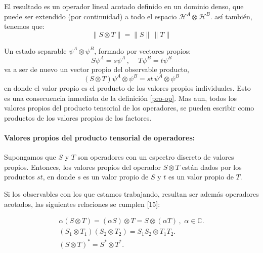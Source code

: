 \documentclass[12pt]{book}
\numberwithin{equation}{chapter}
\def\C{\mathbb{C}}
\def\H{\mathcal{H}}
\def\pr{\otimes}
\begin{document}
El resultado es un operador lineal acotado definido en un dominio denso, que puede ser extendido (por continuidad) a todo el espacio $\H^{A} \pr \H^{B}$. as\'i tambi\'en, tenemos que:
\begin{equation}
\| S \pr T \|= \| S \| \, \| T \|
\end{equation}

Un estado separable $\psi^{A} \pr \psi^{B}$, formado por vectores propios:
\begin{equation}
S\psi^{A}= s \psi^{A} \,,\,\,\,\,\,\,\, T \psi^{B}= t \psi^{B}
\end{equation}
va a ser de nuevo un vector propio del observable producto,
\begin{equation}
(S \pr T)\psi^{A} \pr \psi^{B}= st \, \psi^{A} \pr \psi^{B}
\end{equation}
en donde el valor propio es el producto de los valores propios individuales. Esto es una consecuencia inmediata de la definici\'on \eqref{pro-op}. Mas aun, todos los valores propios del producto tensorial de los operadores, se pueden escribir como productos de los valores propios de los factores. 

\paragraph{Valores propios del producto tensorial de operadores:}
Supongamos que $S$ y $T$ son operadores con un espectro discreto de valores propios. Entonces, los valores propios del operador $S \pr T$ est\'an dados por los productos $st$, en donde $s$ es un valor propio de $S$ y $t$ es un valor propio de $T$. 

\rightline{$\dag$}
\vspace{5 mm}

Si los observables con los que estamos trabajando, resultan ser adem\'as operadores acotados, las siguientes relaciones se cumplen [15]:

\begin{subequations}\label{opp-rel2}
\begin{align}
\alpha ( S \pr T )= (\alpha S) \pr T = S \pr (\alpha T) \,,\,\, \alpha \in \C. \\
( S_{1} \pr T_{1} ) ( S_{2} \pr T_{2} )= S_{1} S_{2} \pr T_{1} T_{2}. \\
( S \pr T )^{*} = S^{*} \pr T^{*}.
\end{align}
\end{subequations}
\end{document}
